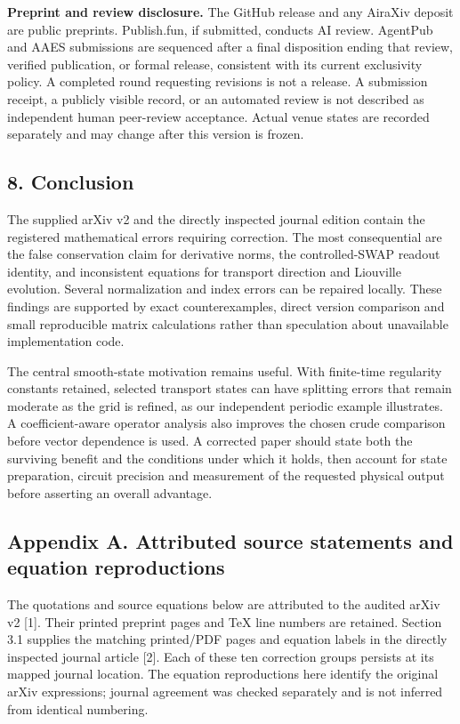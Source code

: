 \textbf{Preprint and review disclosure.} The GitHub release and any
AiraXiv deposit are public preprints. Publish.fun, if submitted,
conducts AI review. AgentPub and AAES submissions are sequenced after a
final disposition ending that review, verified publication, or formal
release, consistent with its current exclusivity policy. A completed
round requesting revisions is not a release. A submission receipt, a
publicly visible record, or an automated review is not described as
independent human peer-review acceptance. Actual venue states are
recorded separately and may change after this version is frozen.

\subsection{8. Conclusion}\label{conclusion}

The supplied arXiv v2 and the directly inspected journal edition contain
the registered mathematical errors requiring correction. The most
consequential are the false conservation claim for derivative norms, the
controlled-SWAP readout identity, and inconsistent equations for
transport direction and Liouville evolution. Several normalization and
index errors can be repaired locally. These findings are supported by
exact counterexamples, direct version comparison and small reproducible
matrix calculations rather than speculation about unavailable
implementation code.

The central smooth-state motivation remains useful. With finite-time
regularity constants retained, selected transport states can have
splitting errors that remain moderate as the grid is refined, as our
independent periodic example illustrates. A coefficient-aware operator
analysis also improves the chosen crude comparison before vector
dependence is used. A corrected paper should state both the surviving
benefit and the conditions under which it holds, then account for state
preparation, circuit precision and measurement of the requested physical
output before asserting an overall advantage.

\subsection{Appendix A. Attributed source statements and equation
reproductions}\label{appendix-a.-attributed-source-statements-and-equation-reproductions}

The quotations and source equations below are attributed to the audited
arXiv v2 {[}1{]}. Their printed preprint pages and TeX line numbers are
retained. Section 3.1 supplies the matching printed/PDF pages and
equation labels in the directly inspected journal article {[}2{]}. Each
of these ten correction groups persists at its mapped journal location.
The equation reproductions here identify the original arXiv expressions;
journal agreement was checked separately and is not inferred from
identical numbering.

